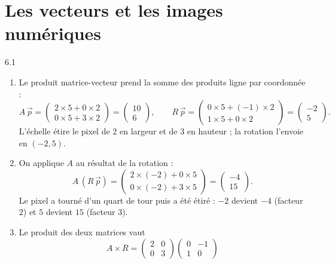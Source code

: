 \clearpage
\chapter{Les vecteurs et les images numériques}

\begin{corrige}{6.1}
\begin{enumerate}
\item Le produit matrice-vecteur prend la somme des produits ligne par coordonnée :
\[
A\,\vec{p} = \begin{pmatrix} 2 \times 5 + 0 \times 2 \\ 0 \times 5 + 3 \times 2 \end{pmatrix} = \begin{pmatrix} 10 \\ 6 \end{pmatrix},
\qquad
R\,\vec{p} = \begin{pmatrix} 0 \times 5 + (-1) \times 2 \\ 1 \times 5 + 0 \times 2 \end{pmatrix} = \begin{pmatrix} -2 \\ 5 \end{pmatrix}.
\]
L'échelle étire le pixel de $2$ en largeur et de $3$ en hauteur ; la rotation l'envoie en $(-2, 5)$.
\item On applique $A$ au résultat de la rotation :
\[
A\,(R\,\vec{p}) = \begin{pmatrix} 2 \times (-2) + 0 \times 5 \\ 0 \times (-2) + 3 \times 5 \end{pmatrix} = \begin{pmatrix} -4 \\ 15 \end{pmatrix}.
\]
Le pixel a tourné d'un quart de tour puis a été étiré : $-2$ devient $-4$ (facteur $2$) et $5$ devient $15$ (facteur $3$).
\item Le produit des deux matrices vaut
\[
A \times R = \begin{pmatrix} 2 & 0 \\ 0 & 3 \end{pmatrix} \begin{pmatrix} 0 & -1 \\ 1 & 0 \end{pmatrix}
\]
\end{enumerate}
\end{corrige}
